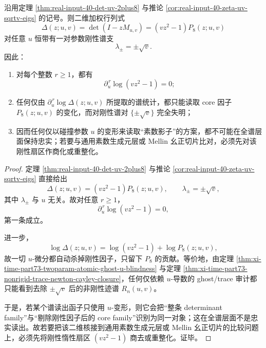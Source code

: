 \begin{proposition}\label{prop:xi-time-part62ae-real-input40-rigid-inert-spectral-pair}
沿用定理 \ref{thm:real-input-40-det-uv-2plus8} 与推论 \ref{cor:real-input-40-zeta-uv-sqrtv-eigs} 的记号。则二维加权行列式
\[
\Delta(z;u,v)=\det(I-zM_{u,v})=(vz^2-1)P_8(z;u,v)
\]
对任意 \(u\) 恒带有一对参数刚性谱支
\[
\lambda_\pm=\pm\sqrt v.
\]
因此：
\begin{enumerate}
  \item 对每个整数 \(r\ge 1\)，都有
  \[
  \partial_u^{\,r}\log(vz^2-1)=0;
  \]
  \item 任何仅由 \(\partial_u^{\,r}\log\Delta(z;u,v)\) 所提取的谱统计，都只能读取 core 因子 \(P_8(z;u,v)\) 的变化，而对刚性谱对 \(\{\pm\sqrt v\}\) 完全失明；
  \item 因而任何仅以碰撞参数 \(u\) 的变形来读取“素数影子”的方案，都不可能在全谱层面保持忠实；若要与通用素数生成元层或 Mellin 幺正切片比对，必须先对该刚性扇区作商化或重整化。
\end{enumerate}
\end{proposition}
\begin{proof}
定理 \ref{thm:real-input-40-det-uv-2plus8} 与推论 \ref{cor:real-input-40-zeta-uv-sqrtv-eigs} 直接给出
\[
\Delta(z;u,v)=(vz^2-1)P_8(z;u,v),
\qquad
\lambda_\pm=\pm\sqrt v,
\]
其中 \(\lambda_\pm\) 与 \(u\) 无关。故对任意 \(r\ge 1\)，
\[
\partial_u^{\,r}\log(vz^2-1)=0,
\]
第一条成立。

进一步，
\[
\log\Delta(z;u,v)=\log(vz^2-1)+\log P_8(z;u,v),
\]
故一切 \(u\)-微分都自动杀掉刚性因子，只留下 \(P_8\) 的贡献。等价地，由定理 \ref{thm:xi-time-part73-twoparam-atomic-ghost-u-blindness} 与定理 \ref{thm:xi-time-part73-nonrigid-trace-newton-cayley-closure}，任何仅依赖 \(u\)-导数的 ghost/trace 审计都只能看到去除 \(\pm\sqrt v\) 后的非刚性迹谱 \(R_n(u,v)\)。

于是，若某个谱读出函子只使用 \(u\)-变形，则它会把“整条 determinant family”与“剔除刚性因子后的 core family”识别为同一对象；这在全谱层面不是忠实读出。故若要把该二维核接到通用素数生成元层或 Mellin 幺正切片的比较问题上，必须先将刚性惰性扇区 \((vz^2-1)\) 商去或重整化。证毕。
\end{proof}

